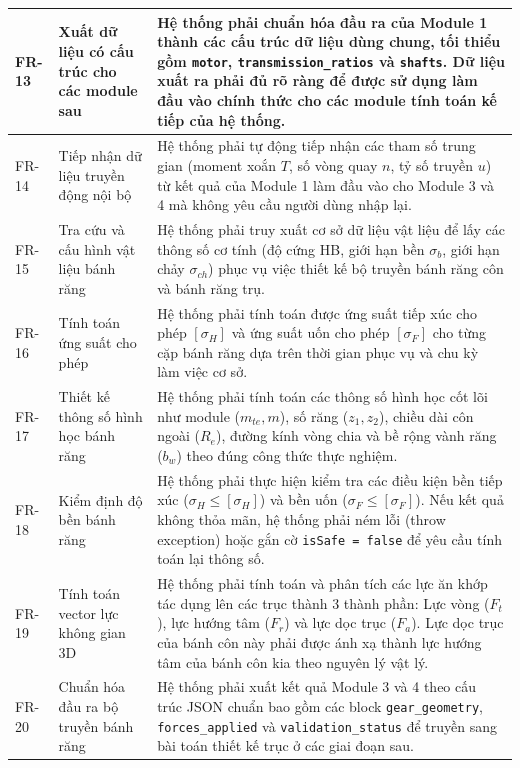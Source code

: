 \documentclass[a4paper]{article}
\begin{document}
\begin{longtable}{|>{\raggedright\arraybackslash}p{1.8cm}|>{\raggedright\arraybackslash}p{4.2cm}|>{\raggedright\arraybackslash}p{8.2cm}|}
FR-13 & Xuất dữ liệu có cấu trúc cho các module sau & Hệ thống phải chuẩn hóa đầu ra của Module 1 thành các cấu trúc dữ liệu dùng chung, tối thiểu gồm \texttt{motor}, \texttt{transmission\_ratios} và \texttt{shafts}. Dữ liệu xuất ra phải đủ rõ ràng để được sử dụng làm đầu vào chính thức cho các module tính toán kế tiếp của hệ thống. \\ \hline

FR-14 & Tiếp nhận dữ liệu truyền động nội bộ & Hệ thống phải tự động tiếp nhận các tham số trung gian (moment xoắn \(T\), số vòng quay \(n\), tỷ số truyền \(u\)) từ kết quả của Module 1 làm đầu vào cho Module 3 và 4 mà không yêu cầu người dùng nhập lại. \\ \hline

FR-15 & Tra cứu và cấu hình vật liệu bánh răng & Hệ thống phải truy xuất cơ sở dữ liệu vật liệu để lấy các thông số cơ tính (độ cứng HB, giới hạn bền \(\sigma_b\), giới hạn chảy \(\sigma_{ch}\)) phục vụ việc thiết kế bộ truyền bánh răng côn và bánh răng trụ. \\ \hline

FR-16 & Tính toán ứng suất cho phép & Hệ thống phải tính toán được ứng suất tiếp xúc cho phép \([\sigma_H]\) và ứng suất uốn cho phép \([\sigma_F]\) cho từng cặp bánh răng dựa trên thời gian phục vụ và chu kỳ làm việc cơ sở. \\ \hline

FR-17 & Thiết kế thông số hình học bánh răng & Hệ thống phải tính toán các thông số hình học cốt lõi như module (\(m_{te}, m\)), số răng (\(z_1, z_2\)), chiều dài côn ngoài (\(R_e\)), đường kính vòng chia và bề rộng vành răng (\(b_w\)) theo đúng công thức thực nghiệm. \\ \hline

FR-18 & Kiểm định độ bền bánh răng & Hệ thống phải thực hiện kiểm tra các điều kiện bền tiếp xúc (\(\sigma_H \le [\sigma_H]\)) và bền uốn (\(\sigma_F \le [\sigma_F]\)). Nếu kết quả không thỏa mãn, hệ thống phải ném lỗi (throw exception) hoặc gắn cờ \texttt{isSafe = false} để yêu cầu tính toán lại thông số. \\ \hline

FR-19 & Tính toán vector lực không gian 3D & Hệ thống phải tính toán và phân tích các lực ăn khớp tác dụng lên các trục thành 3 thành phần: Lực vòng (\(F_t\)), lực hướng tâm (\(F_r\)) và lực dọc trục (\(F_a\)). Lực dọc trục của bánh côn này phải được ánh xạ thành lực hướng tâm của bánh côn kia theo nguyên lý vật lý. \\ \hline

FR-20 & Chuẩn hóa đầu ra bộ truyền bánh răng & Hệ thống phải xuất kết quả Module 3 và 4 theo cấu trúc JSON chuẩn bao gồm các block \texttt{gear\_geometry}, \texttt{forces\_applied} và \texttt{validation\_status} để truyền sang bài toán thiết kế trục ở các giai đoạn sau. \\ \hline

\end{longtable}
\end{document}
